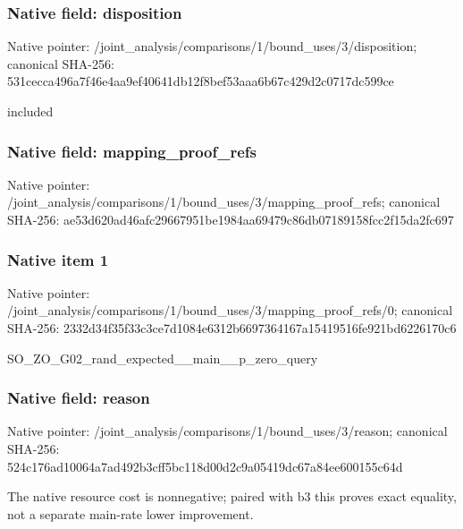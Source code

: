 \documentclass[10pt,a4paper]{article}
\begin{document}
\subsubsection{Native field: disposition}
Native pointer: /joint\_\allowbreak{}analysis/comparisons/1/bound\_\allowbreak{}uses/3/disposition; canonical SHA-256: 531cecca496a7f46e4aa9ef40641db12f8bef53aaa6b67c429d2c0717dc599ce

\begingroup\raggedright\sloppy included\par\endgroup

\subsubsection{Native field: mapping\_\allowbreak{}proof\_\allowbreak{}refs}
Native pointer: /joint\_\allowbreak{}analysis/comparisons/1/bound\_\allowbreak{}uses/3/mapping\_\allowbreak{}proof\_\allowbreak{}refs; canonical SHA-256: ae53d620ad46afc29667951be1984aa69479c86db07189158fcc2f15da2fc697

\subsubsection{Native item 1}
Native pointer: /joint\_\allowbreak{}analysis/comparisons/1/bound\_\allowbreak{}uses/3/mapping\_\allowbreak{}proof\_\allowbreak{}refs/0; canonical SHA-256: 2332d34f35f33c3ce7d1084e6312b6697364167a15419516fe921bd6226170c6

\begingroup\raggedright\sloppy SO\_\allowbreak{}ZO\_\allowbreak{}G02\_\allowbreak{}rand\_\allowbreak{}expected\_\allowbreak{}\_\allowbreak{}main\_\allowbreak{}\_\allowbreak{}p\_\allowbreak{}zero\_\allowbreak{}query\par\endgroup

\subsubsection{Native field: reason}
Native pointer: /joint\_\allowbreak{}analysis/comparisons/1/bound\_\allowbreak{}uses/3/reason; canonical SHA-256: 524c176ad10064a7ad492b3cff5bc118d00d2c9a05419dc67a84ee600155c64d

\begingroup\raggedright\sloppy The native resource cost is nonnegative;\allowbreak{} paired with b3 this proves exact equality,\allowbreak{} not a separate main-rate lower improvement.\par\endgroup
\end{document}
